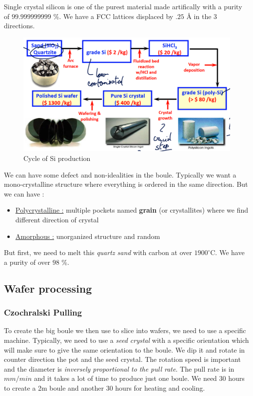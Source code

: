 \documentclass{report}
\begin{document}
Single crystal silicon is one of the purest material made artifically  with a purity of $99.999999999$ \%. We have a FCC lattices displaced by $.25$ \r{A} in the 3 directions.

\begin{figure}[H]
    \centering
    \includegraphics[width=0.75\linewidth]{cycle_si.png}
    \caption{Cycle of Si production}
    \label{fig:si-production-label}
\end{figure}

We can have some defect and non-idealities in the boule. Typically we want a mono-crystalline structure where everything is ordered in the same direction. But we can have :

\begin{itemize}
    \item \underline{Polycrystalline :} multiple pockets named \textbf{grain} (or crystallites) where we find different direction of crystal
    \item \underline{Amorphous :} unorganized structure and random
\end{itemize}

But first, we need to melt this \textit{quartz sand} with carbon at over $1900^\circ$C. We have a purity of over $98$ \%.

\subsection{Wafer processing}

\subsubsection{Czochralski Pulling}

To create the big boule we then use to slice into wafers, we need to use a specific machine. Typically, we need to use a \textit{seed crystal} with a specific orientation which will make sure to give the same orientation to the boule. We dip it and rotate in counter direction the pot and the seed crystal. The rotation speed is important and the diameter is \textit{inversely proportional to the pull rate}. The pull rate is in $mm/min$ and it takes a lot of time to produce just one boule. We need 30 hours to create a 2m boule and another 30 hours for heating and cooling.\\
\end{document}
